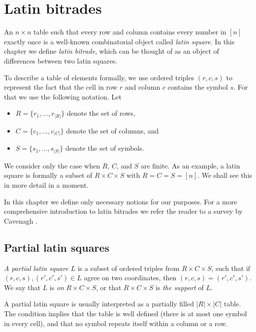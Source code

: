 \chapter{Latin bitrades}
\label{chap:bitrades}

An $n \times n$ table such that every row and column contains every number in $[n]$ exactly once is a well-known combinatorial object called \emph{latin square}. In this chapter we define \emph{latin bitrade}, which can be thought of as an object of differences between two latin squares.

To describe a table of elements formally, we use ordered triples $(r,c,s)$ to represent the fact that the cell in row $r$ and column $c$ contains the symbol $s$. For that we use the following notation. Let
\begin{itemize}
	\item $R = \{r_1,\dots,r_{|R|}\}$ denote the set of rows,
	\item $C = \{c_1,\dots,c_{|C|}\}$ denote the set of columns, and
	\item $S = \{s_1,\dots,s_{|S|}\}$ denote the set of symbols.
\end{itemize}
We consider only the case when $R$, $C$, and $S$ are finite. As an example, a latin square is formally a subset of $R \times C \times S$ with $R = C = S = [n]$. We shall see this in more detail in a moment.

In this chapter we define only necessary notions for our purposes. For a more comprehensive introduction to latin bitrades we refer the reader to a survey by Cavenagh \cite{Cavenagh08}.

\section{Partial latin squares}

\begin{defn}
\emph{A partial latin square $L$} is a subset of ordered triples from $R \times C \times S$, such that if $(r,c,s),(r',c',s')\in L$ agree on two coordinates, then $(r,c,s) = (r',c',s')$. We say that $L$ is \emph{on} $R \times C \times S$, or that $R \times C \times S$ is \emph{the support} of $L$.
\end{defn}

A partial latin square is usually interpreted as a partially filled $|R| \times |C|$ table. The condition implies that the table is well defined (there is at most one symbol in every cell), and that no symbol repeats itself within a column or a row.

